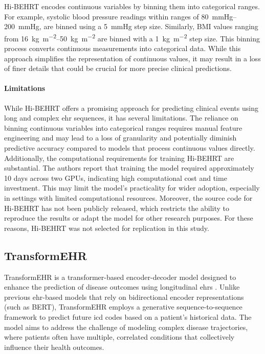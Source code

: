 Hi-BEHRT encodes continuous variables by binning them into categorical ranges. For example, systolic blood pressure readings within ranges of \qtyrange{80}{200}{\mmHg}, are binned using a \qty{5}{\mmHg} step size. Similarly, BMI values ranging from \qtyrange{16}{50}{\kilogram\per\meter\squared} are binned with a \qty{1}{\kilogram\per\meter\squared} step size. This binning process converts continuous measurements into categorical data. While this approach simplifies the representation of continuous values, it may result in a loss of finer details that could be crucial for more precise clinical predictions.

\paragraph{Limitations}

While Hi-BEHRT offers a promising approach for predicting clinical events using long and complex \gls{ehr} sequences, it has several limitations.
The reliance on binning continuous variables into categorical ranges requires manual feature engineering and may lead to a loss of granularity and potentially diminish predictive accuracy compared to models that process continuous values directly.
Additionally, the computational requirements for training Hi-BEHRT are substantial.
The authors report that training the model required approximately \num{10} days across two GPUs, indicating high computational cost and time investment.
This may limit the model's practicality for wider adoption, especially in settings with limited computational resources.
Moreover, the source code for Hi-BEHRT has not been publicly released, which restricts the ability to reproduce the results or adapt the model for other research purposes.
For these reasons, Hi-BEHRT was not selected for replication in this study.

\subsection{TransformEHR}

TransformEHR is a transformer-based encoder-decoder model designed to enhance the prediction of disease outcomes using longitudinal \glspl{ehr} \cite{TransformEHR2023}. Unlike previous \gls{ehr}-based models that rely on bidirectional encoder representations (such as BERT), TransformEHR employs a generative sequence-to-sequence framework to predict future \gls{icd} codes based on a patient's historical data. The model aims to address the challenge of modeling complex disease trajectories, where patients often have multiple, correlated conditions that collectively influence their health outcomes.

